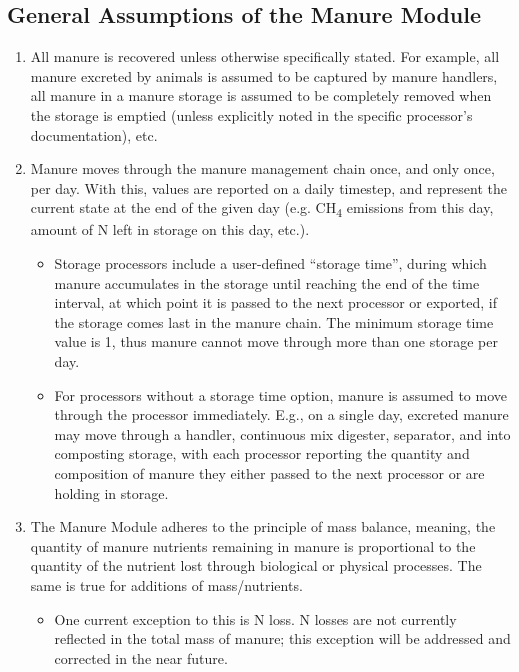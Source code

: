 \begin{refsection}
\subsection{General Assumptions of the Manure Module}
        \begin{enumerate}
            \item All manure is recovered unless otherwise specifically stated. For example, all manure excreted by animals is assumed to be captured by manure handlers, all manure in a manure storage is assumed to be completely removed when the storage is emptied (unless explicitly noted in the specific processor’s documentation), etc. 
            \item Manure moves through the manure management chain once, and only once, per day. With this, values are reported on a daily timestep, and represent the current state at the end of the given day (e.g. CH\textsubscript{4} emissions from this day, amount of N left in storage on this day, etc.). 
                \begin {itemize}
                    \item Storage processors include a user-defined “storage time”, during which manure accumulates in the storage until reaching the end of the time interval, at which point it is passed to the next processor or exported, if the storage comes last in the manure chain.  The minimum storage time value is 1, thus manure cannot move through more than one storage per day. 
                    \item For processors without a storage time option, manure is assumed to move through the processor immediately. E.g., on a single day, excreted manure may move through a handler, continuous mix digester, separator, and into composting storage, with each processor reporting the quantity and composition of manure they either passed to the next processor or are holding in storage.
                \end{itemize}
            \item The Manure Module adheres to the principle of mass balance, meaning, the quantity of manure nutrients remaining in manure is proportional to the quantity of the nutrient lost through biological or physical processes. The same is true for additions of mass/nutrients.
                \begin{itemize}
                    \item One current exception to this is N loss. N losses are not currently reflected in the total mass of manure; this exception will be addressed and corrected in the near future. 
		      \end{itemize}
        \end{enumerate}


\end{refsection}
